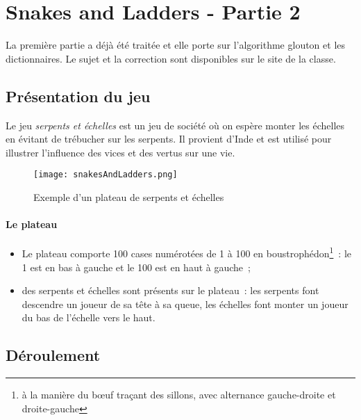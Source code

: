 

\section*{Snakes and Ladders - Partie 2}

La première partie a déjà été traitée et elle porte sur l'algorithme glouton et les dictionnaires. Le sujet et la correction sont disponibles sur le site de la classe.

\subsection*{Présentation du jeu}

Le jeu \emph{serpents et échelles} est un jeu de société où on espère monter les échelles en évitant de trébucher sur les serpents. Il provient d'Inde et est utilisé pour illustrer l'influence des vices et des vertus sur une vie.

\begin{figure}[h]
	\begin{center}
		\texttt{[image: snakesAndLadders.png]}
	\end{center}
	\caption{Exemple d'un plateau de serpents et échelles}
	\label{fig:1}
\end{figure}

\paragraph*{Le plateau}

\begin{itemize}
	\item Le plateau comporte 100 cases numérotées de 1 à 100 en boustrophédon\footnote{à la manière du bœuf traçant des sillons, avec alternance gauche-droite et droite-gauche}~: le 1 est en bas à gauche et le 100 est en haut à gauche~;
	\item des serpents et échelles sont présents sur le plateau~: les serpents font descendre un joueur de sa tête à sa queue, les échelles font monter un joueur du bas de l'échelle vers le haut.
\end{itemize}

\subsection*{Déroulement}

